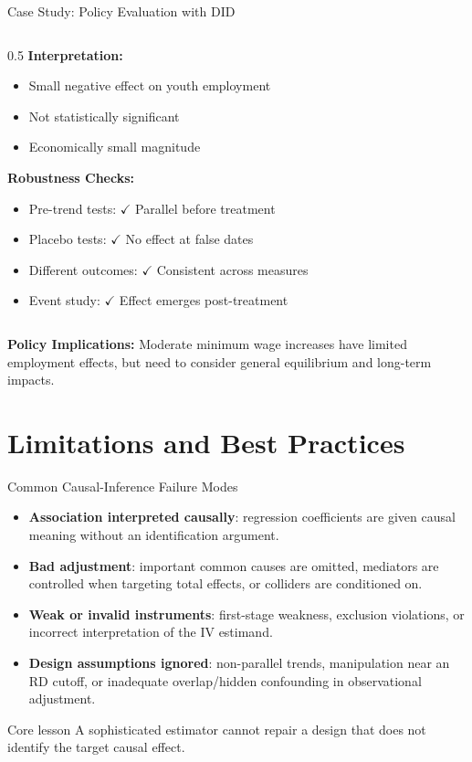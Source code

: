 \documentclass[aspectratio=169,11pt]{beamer}
\begin{document}
\begin{frame}{Case Study: Policy Evaluation with DID}
\begin{columns}
\begin{column}{0.5\textwidth}
\textbf{Interpretation:}
\begin{itemize}
\item Small negative effect on youth employment
\item Not statistically significant
\item Economically small magnitude
\end{itemize}

\vspace{0.3cm}
\textbf{Robustness Checks:}
\begin{itemize}
\item Pre-trend tests: \(\checkmark\) Parallel before treatment
\item Placebo tests: \(\checkmark\) No effect at false dates
\item Different outcomes: \(\checkmark\) Consistent across measures
\item Event study: \(\checkmark\) Effect emerges post-treatment
\end{itemize}
\end{column}
\end{columns}

\textbf{Policy Implications:} Moderate minimum wage increases have limited employment effects, but need to consider general equilibrium and long-term impacts.
\end{frame}

\section{Limitations and Best Practices}

\begin{frame}{Common Causal-Inference Failure Modes}
\begin{itemize}
  \item \textbf{Association interpreted causally}: regression coefficients are given causal meaning without an identification argument.
  \item \textbf{Bad adjustment}: important common causes are omitted, mediators are controlled when targeting total effects, or colliders are conditioned on.
  \item \textbf{Weak or invalid instruments}: first-stage weakness, exclusion violations, or incorrect interpretation of the IV estimand.
  \item \textbf{Design assumptions ignored}: non-parallel trends, manipulation near an RD cutoff, or inadequate overlap/hidden confounding in observational adjustment.
\end{itemize}

\begin{alertblock}{Core lesson}
A sophisticated estimator cannot repair a design that does not identify the target causal effect.
\end{alertblock}
\end{frame}
\end{document}
